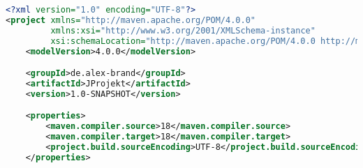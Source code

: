 \documentclass[./einleitung.tex]{subfiles}
\begin{document}
    \begin{lstlisting}[language=xml, caption=pom.xml des JProjekt Artefakts, label=lst:pomJProjekt]
<?xml version="1.0" encoding="UTF-8"?>
<project xmlns="http://maven.apache.org/POM/4.0.0"
         xmlns:xsi="http://www.w3.org/2001/XMLSchema-instance"
         xsi:schemaLocation="http://maven.apache.org/POM/4.0.0 http://maven.apache.org/xsd/maven-4.0.0.xsd">
    <modelVersion>4.0.0</modelVersion>

    <groupId>de.alex-brand</groupId>
    <artifactId>JProjekt</artifactId>
    <version>1.0-SNAPSHOT</version>

    <properties>
        <maven.compiler.source>18</maven.compiler.source>
        <maven.compiler.target>18</maven.compiler.target>
        <project.build.sourceEncoding>UTF-8</project.build.sourceEncoding>
    </properties>


\end{lstlisting}
\end{document}
